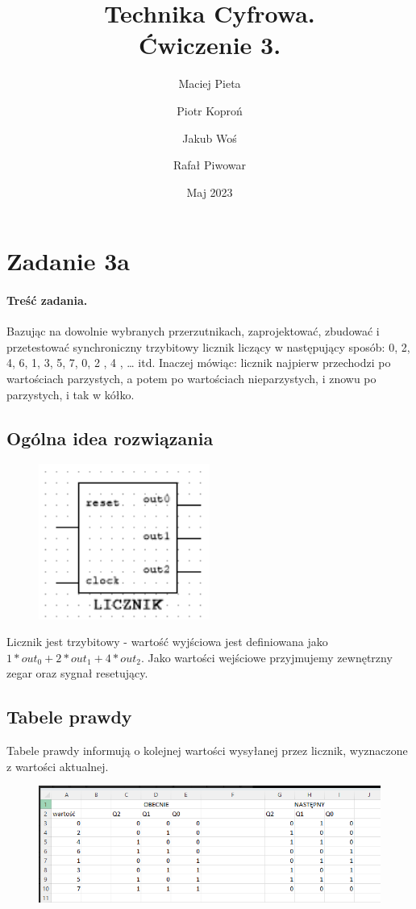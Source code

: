 \documentclass{article}
\author{Maciej Pieta \and Piotr Koproń \and Jakub Woś \and Rafał Piwowar}
\date{Maj 2023}
\title{Technika Cyfrowa. \\ Ćwiczenie 3.}
\begin{document}
\maketitle
\newpage
\section{Zadanie 3a}
\paragraph{Treść zadania.}
Bazując na dowolnie wybranych przerzutnikach, zaprojektować, zbudować i przetestować synchroniczny trzybitowy licznik liczący w następujący sposób:
     0, 2, 4, 6, 1, 3, 5, 7, 0, 2 , 4 , … itd.
Inaczej mówiąc: licznik najpierw przechodzi po wartościach parzystych, a potem po wartościach nieparzystych, i znowu po parzystych, i tak w kółko.
\subsection{Ogólna idea rozwiązania}
\begin{figure}[H]
\includegraphics[width = 0.5\textwidth]{3a_blackbox}
\end{figure}
Licznik jest trzybitowy - wartość wyjściowa jest definiowana jako $1*out_{0}+2*out_{1}+4*out_{2}$.
Jako wartości wejściowe przyjmujemy zewnętrzny zegar oraz sygnał resetujący.
\subsection{Tabele prawdy}
Tabele prawdy informują o kolejnej wartości wysyłanej przez licznik, wyznaczone z wartości aktualnej.
\begin{figure}[H]
\includegraphics[width = \textwidth]{3a_tabele_prawdy}
\end{figure}
\end{document}
